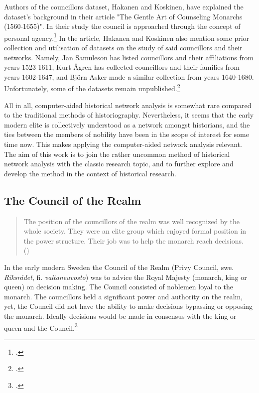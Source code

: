 Authors of the councillors dataset, Hakanen and Koskinen, have explained the dataset's background in their article "The Gentle Art of Counseling Monarchs (1560-1655)". In their study the council is approached through the concept of personal agency.\footcite{HakanenAKoskinen2017} In the article, Hakanen and Koskinen also mention some prior collection and utilisation of datasets on the study of said councillors and their networks. Namely, Jan Samuleson has listed councillors and their affiliations from years 1523-1611, Kurt Ågren has collected councillors and their families from years 1602-1647, and Björn Asker made a similar collection from years 1640-1680. Unfortunately, some of the datasets remain unpublished.\footcite[p. 48, 67 (cite 4).]{HakanenAKoskinen2017} 

All in all, computer-aided historical network analysis is somewhat rare compared to the traditional methods of historiography. Nevertheless, it seems that the early modern elite is collectively understood as a network amongst historians, and the ties between the members of nobility have been in the scope of interest for some time now. This makes applying the computer-aided network analysis relevant. The aim of this work is to join the rather uncommon method of historical network analysis with the classic research topic, and to further explore and develop the method in the context of historical research.

\subsection{The Council of the Realm}
\label{councilofrealm}
\begin{quote}
	The position of the councillors of the realm was well recognized by the whole society. They were an elite group which enjoyed formal position in the power structure. Their job was to help the monarch reach decisions.\\
	(\cite[p. 26.]{agencyAndStateBuilding})
\end{quote}

In the early modern Sweden the Council of the Realm (Privy Council, swe. \textit{Riksrådet}, fi. \textit{valtaneuvosto}) was to advice the Royal Majesty (monarch, king or queen) on decision making. The Council consisted of noblemen loyal to the monarch. The councillors held a significant power and authority on the realm, yet, the Council did not have the ability to make decisions bypassing or opposing the monarch. Ideally decisions would be made in consensus with the king or queen and the Council.\footcites[pp. 13-14,]{hopesAndFearsIntro}[pp. 47-50.]{HakanenAKoskinen2017}

